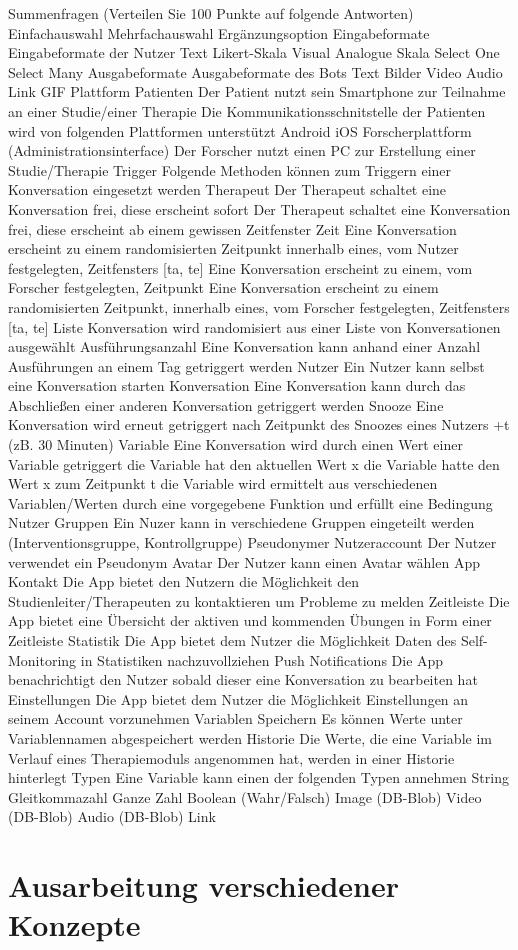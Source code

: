 		Summenfragen (Verteilen Sie 100 Punkte auf folgende Antworten)
		Einfachauswahl
		Mehrfachauswahl
		Ergänzungsoption
Eingabeformate	Eingabeformate der Nutzer	Text
		Likert-Skala
		Visual Analogue Skala
		Select One
		Select Many
Ausgabeformate	Ausgabeformate des Bots	Text
		Bilder
		Video
		Audio
		Link
		GIF
Plattform	Patienten	Der Patient nutzt sein Smartphone zur Teilnahme an einer Studie/einer Therapie
		Die Kommunikationsschnitstelle der Patienten wird von folgenden Plattformen unterstützt
		Android
		iOS
	Forscherplattform (Administrationsinterface)	Der Forscher nutzt einen PC zur Erstellung einer Studie/Therapie
Trigger	Folgende Methoden können zum Triggern einer Konversation eingesetzt werden	
	Therapeut	Der Therapeut schaltet eine Konversation frei, diese erscheint sofort
		Der Therapeut schaltet eine Konversation frei, diese erscheint ab einem gewissen Zeitfenster
	Zeit	Eine Konversation erscheint zu einem randomisierten Zeitpunkt innerhalb eines, vom Nutzer festgelegten, Zeitfensters [ta, te] 
		Eine Konversation erscheint zu einem, vom Forscher festgelegten, Zeitpunkt
		Eine Konversation erscheint zu einem randomisierten Zeitpunkt, innerhalb eines, vom Forscher festgelegten, Zeitfensters [ta, te]
	Liste	Konversation wird randomisiert aus einer Liste von Konversationen ausgewählt
	Ausführungsanzahl	Eine Konversation kann anhand einer Anzahl Ausführungen an einem Tag getriggert werden
	Nutzer	Ein Nutzer kann selbst eine Konversation starten 
	Konversation	Eine Konversation kann durch das Abschließen einer anderen Konversation getriggert werden
	Snooze	Eine Konversation wird erneut getriggert nach Zeitpunkt des Snoozes eines Nutzers +t (zB. 30 Minuten)
	Variable	Eine Konversation wird durch einen Wert einer Variable getriggert
		die Variable hat den aktuellen Wert x
		die Variable hatte den Wert x zum Zeitpunkt t
		die Variable wird ermittelt aus verschiedenen Variablen/Werten durch eine vorgegebene Funktion und erfüllt eine Bedingung
Nutzer	Gruppen	Ein Nuzer kann in verschiedene Gruppen eingeteilt werden (Interventionsgruppe, Kontrollgruppe)
	Pseudonymer Nutzeraccount	Der Nutzer verwendet ein Pseudonym
	Avatar	Der Nutzer kann einen Avatar wählen
App	Kontakt	Die App bietet den Nutzern die Möglichkeit den Studienleiter/Therapeuten zu kontaktieren um Probleme zu melden
	Zeitleiste	Die App bietet eine Übersicht der aktiven und kommenden Übungen in Form einer Zeitleiste
	Statistik	Die App bietet dem Nutzer die Möglichkeit Daten des Self-Monitoring in Statistiken nachzuvollziehen
	Push Notifications	Die App benachrichtigt den Nutzer sobald dieser eine Konversation zu bearbeiten hat
	Einstellungen	Die App bietet dem Nutzer die Möglichkeit Einstellungen an seinem Account vorzunehmen
Variablen	Speichern	Es können Werte unter Variablennamen abgespeichert werden
	Historie	Die Werte, die eine Variable im Verlauf eines Therapiemoduls angenommen hat, werden in einer Historie hinterlegt
	Typen	Eine Variable kann einen der folgenden Typen annehmen
		String
		Gleitkommazahl
		Ganze Zahl 
		Boolean (Wahr/Falsch)
		Image (DB-Blob)
		Video (DB-Blob)
		Audio (DB-Blob)
		Link


\section{Ausarbeitung verschiedener Konzepte}




